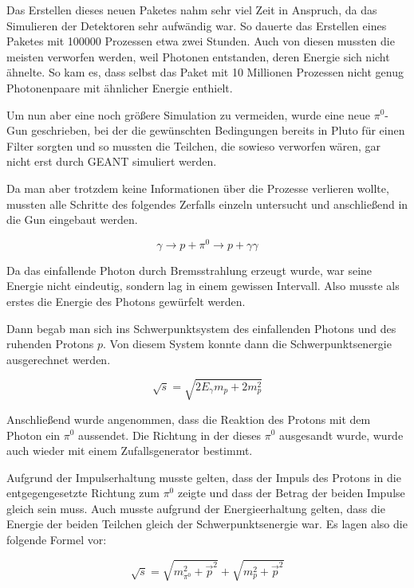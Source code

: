 \documentclass[a4paper,11pt,oneside,final,german,openbib,pdftex]{scrbook}
\begin{document}
{Das Erstellen dieses neuen Paketes nahm sehr viel Zeit in Anspruch, da das Simulieren der Detektoren sehr aufw\"andig war. So dauerte das Erstellen eines Paketes mit 100000 Prozessen etwa zwei Stunden. Auch von diesen mussten die meisten verworfen werden, weil Photonen entstanden, deren Energie sich nicht \"ahnelte. So kam es, dass selbst das Paket mit 10 Millionen Prozessen nicht genug Photonenpaare mit \"ahnlicher Energie enthielt.
 
 Um nun aber eine noch größere Simulation zu vermeiden, wurde eine neue $\pi^0$-Gun geschrieben, bei der die gew\"unschten Bedingungen bereits in Pluto f\"ur einen Filter sorgten und so mussten die Teilchen, die sowieso verworfen w\"aren, gar nicht erst durch GEANT simuliert werden. 

Da man aber trotzdem keine Informationen \"uber die Prozesse verlieren wollte, mussten alle Schritte des folgendes Zerfalls einzeln untersucht und anschließend in die Gun eingebaut werden. 

\begin{equation}
\gamma \rightarrow p + \pi^0 \rightarrow p + \gamma \gamma 
\end{equation}

Da das einfallende Photon durch Bremsstrahlung erzeugt wurde, war seine Energie nicht eindeutig, sondern lag in einem gewissen Intervall. Also musste als erstes die Energie des Photons gew\"urfelt werden.

Dann begab man sich ins Schwerpunktsystem des einfallenden Photons und des ruhenden Protons $p$. 
Von diesem System konnte dann die Schwerpunktsenergie ausgerechnet werden.

\begin{equation}
\sqrt{s}= \sqrt{2E_{\gamma}m_p+2m_p^2}
\end{equation}

Anschlie{\ss}end wurde angenommen, dass die Reaktion des Protons mit dem Photon ein $\pi^0$ aussendet. Die Richtung in der dieses $\pi^0$ ausgesandt wurde, wurde auch wieder mit einem Zufallsgenerator bestimmt. 

Aufgrund der Impulserhaltung musste gelten, dass der Impuls des Protons in die entgegengesetzte Richtung zum $\pi^0$ zeigte und dass der Betrag der beiden Impulse gleich sein muss. Auch musste aufgrund der Energieerhaltung gelten, dass die Energie der beiden Teilchen gleich der Schwerpunktsenergie war. Es lagen also die folgende Formel vor:

	\begin{equation}
	\sqrt{s}=\sqrt{m_{\pi^0}^2+\overrightarrow{p}^2} + \sqrt{m_{p}^2+\overrightarrow{p}^2}
	\end{equation}

}
\end{document}
